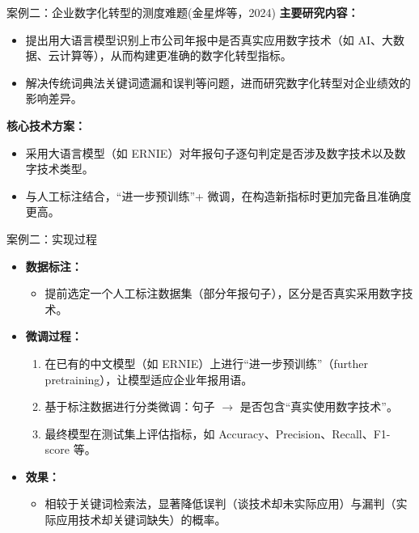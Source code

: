 \documentclass{beamer}
\begin{document}
    
    \begin{frame}{案例二：企业数字化转型的测度难题(金星烨等，2024)}
    \textbf{主要研究内容：}
    \begin{itemize}
      \item 提出用大语言模型识别上市公司年报中是否真实应用数字技术（如 AI、大数据、云计算等），从而构建更准确的数字化转型指标。
      \item 解决传统词典法关键词遗漏和误判等问题，进而研究数字化转型对企业绩效的影响差异。
    \end{itemize}
    
    \textbf{核心技术方案：}
    \begin{itemize}
      \item 采用大语言模型（如 ERNIE）对年报句子逐句判定是否涉及数字技术以及数字技术类型。
      \item 与人工标注结合，“进一步预训练”+ 微调，在构造新指标时更加完备且准确度更高。
    \end{itemize}
    \end{frame}
    
    \begin{frame}{案例二：实现过程}
    \begin{itemize}
      \item \textbf{数据标注：}
      \begin{itemize}
        \item 提前选定一个人工标注数据集（部分年报句子），区分是否真实采用数字技术。
      \end{itemize}
      \item \textbf{微调过程：}
      \begin{enumerate}
        \item 在已有的中文模型（如 ERNIE）上进行“进一步预训练”（further pretraining），让模型适应企业年报用语。
        \item 基于标注数据进行分类微调：句子 $\rightarrow$ 是否包含“真实使用数字技术”。
        \item 最终模型在测试集上评估指标，如 Accuracy、Precision、Recall、F1-score 等。
      \end{enumerate}
      \item \textbf{效果：}
      \begin{itemize}
        \item 相较于关键词检索法，显著降低误判（谈技术却未实际应用）与漏判（实际应用技术却关键词缺失）的概率。
      \end{itemize}
    \end{itemize}
    \end{frame}
\end{document}
